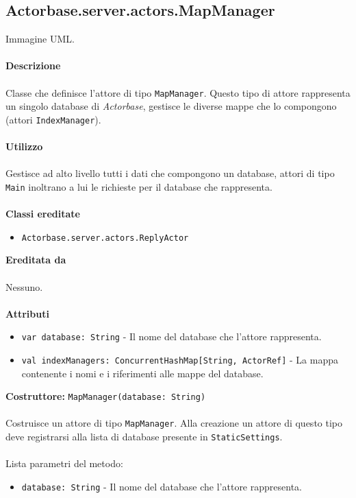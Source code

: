 \documentclass[a4paper]{article}
\begin{document}
	\subsection{Actorbase.server.actors.MapManager}
		Immagine UML.
		\\ \\
		\textbf{Descrizione}
			\\ \\
			Classe che definisce l'attore di tipo \texttt{MapManager}. Questo tipo di attore rappresenta un singolo database di \emph{Actorbase}, gestisce le diverse mappe che lo compongono (attori \texttt{IndexManager}).
			\\ \\
		\textbf{Utilizzo}
			\\ \\
			Gestisce ad alto livello tutti i dati che compongono un database, attori di tipo \texttt{Main} inoltrano a lui le richieste per il database che rappresenta.
			\\ \\
		\textbf{Classi ereditate}
			\begin{itemize}
				\item \texttt{Actorbase.server.actors.ReplyActor}
			\end{itemize}
		\textbf{Ereditata da}
			\\ \\
			Nessuno.
			\\ \\
		\textbf{Attributi}
			\begin{itemize}
				\item \texttt{var database: String} - Il nome del database che l'attore rappresenta. 
				\item \texttt{val indexManagers: ConcurrentHashMap[String, ActorRef]} - La mappa contenente i nomi e i riferimenti alle mappe del database.
			\end{itemize}
		\textbf{Costruttore: }\texttt{MapManager(database: String)}
			\\ \\
			Costruisce un attore di tipo \texttt{MapManager}. Alla creazione un attore di questo tipo deve registrarsi alla lista di database presente in \texttt{StaticSettings}.
			\\ \\
			Lista parametri del metodo:
			\begin{itemize}
				\item \texttt{database: String} - Il nome del database che l'attore rappresenta.
			\end{itemize}
\end{document}
